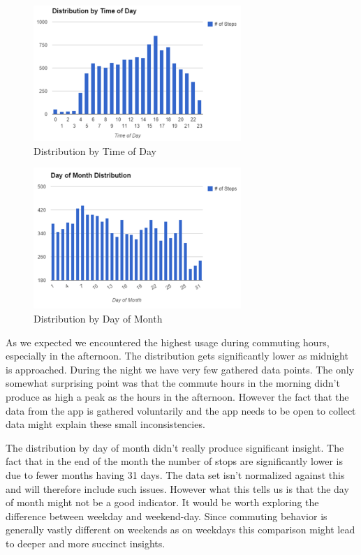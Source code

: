 \begin{figure}[H]
	\centering
	\includegraphics[width=0.7\textwidth]{charts/distribution_time_of_day}
	\caption{Distribution by Time of Day}
\end{figure}

\begin{figure}[H]
	\centering
	\includegraphics[width=0.7\textwidth]{charts/day_of_month_distribution}
	\caption{Distribution by Day of Month}
\end{figure}

As we expected we encountered the highest usage during commuting hours, especially in the afternoon. The distribution gets significantly lower as midnight is approached. During the night we have very few gathered data points. The only somewhat surprising point was that the commute hours in the morning didn't produce as high a peak as the hours in the afternoon. However the fact that the data from the app is gathered voluntarily and the app needs to be open to collect data might explain these small inconsistencies.

The distribution by day of month didn't really produce significant insight. The fact that in the end of the month the number of stops are significantly lower is due to fewer months having 31 days. The data set isn't normalized against this and will therefore include such issues. However what this tells us is that the day of month might not be a good indicator. It would be worth exploring the difference between weekday and weekend-day. Since commuting behavior is generally vastly different on weekends as on weekdays this comparison might lead to deeper and more succinct insights.

